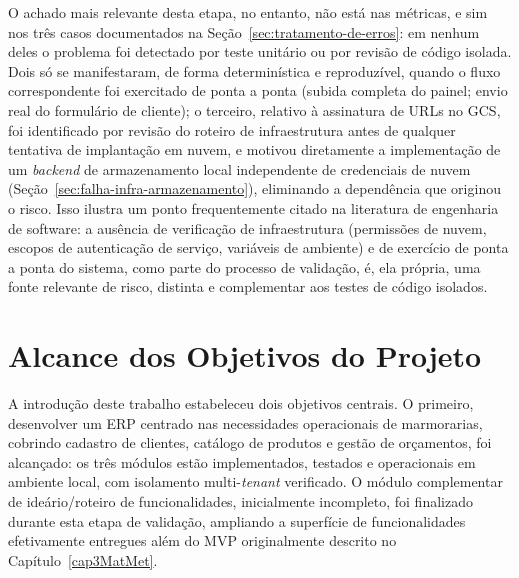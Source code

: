 O achado mais relevante desta etapa, no entanto, não está nas métricas, e sim nos três casos documentados na Seção~\ref{sec:tratamento-de-erros}: em nenhum deles o problema foi detectado por teste unitário ou por revisão de código isolada. Dois só se manifestaram, de forma determinística e reproduzível, quando o fluxo correspondente foi exercitado de ponta a ponta (subida completa do painel; envio real do formulário de cliente); o terceiro, relativo à assinatura de URLs no GCS, foi identificado por revisão do roteiro de infraestrutura antes de qualquer tentativa de implantação em nuvem, e motivou diretamente a implementação de um \textit{backend} de armazenamento local independente de credenciais de nuvem (Seção~\ref{sec:falha-infra-armazenamento}), eliminando a dependência que originou o risco. Isso ilustra um ponto frequentemente citado na literatura de engenharia de software: a ausência de verificação de infraestrutura (permissões de nuvem, escopos de autenticação de serviço, variáveis de ambiente) e de exercício de ponta a ponta do sistema, como parte do processo de validação, é, ela própria, uma fonte relevante de risco, distinta e complementar aos testes de código isolados.

\section{Alcance dos Objetivos do Projeto}
\label{sec:alcance-objetivos}

A introdução deste trabalho estabeleceu dois objetivos centrais. O primeiro, desenvolver um ERP centrado nas necessidades operacionais de marmorarias, cobrindo cadastro de clientes, catálogo de produtos e gestão de orçamentos, foi alcançado: os três módulos estão implementados, testados e operacionais em ambiente local, com isolamento multi-\textit{tenant} verificado. O módulo complementar de ideário/roteiro de funcionalidades, inicialmente incompleto, foi finalizado durante esta etapa de validação, ampliando a superfície de funcionalidades efetivamente entregues além do MVP originalmente descrito no Capítulo~\ref{cap3MatMet}.

